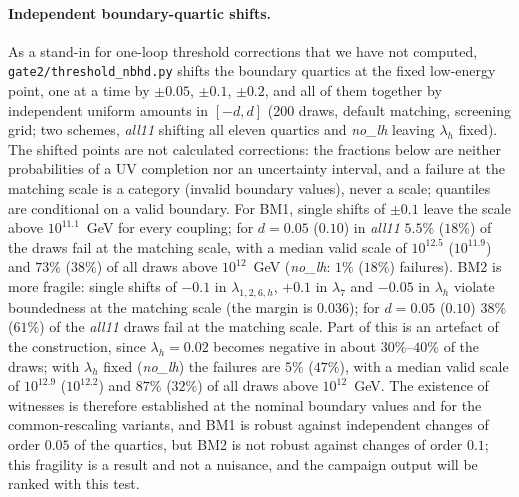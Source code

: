 \documentclass[twocolumn,epjc3]{svjour3}
\begin{document}
\paragraph{Independent boundary-quartic shifts.} As a stand-in for one-loop threshold corrections that we have not computed, \texttt{gate2/threshold\_nbhd.py} shifts the boundary quartics at the fixed low-energy point, one at a time by $\pm0.05$, $\pm0.1$, $\pm0.2$, and all of them together by independent uniform amounts in $[-d,d]$ ($200$ draws, default matching, screening grid; two schemes, \emph{all11} shifting all eleven quartics and \emph{no\_lh} leaving $\lambda_h$ fixed). The shifted points are not calculated corrections: the fractions below are neither probabilities of a UV completion nor an uncertainty interval, and a failure at the matching scale is a category (invalid boundary values), never a scale; quantiles are conditional on a valid boundary. For BM1, single shifts of $\pm0.1$ leave the scale above $10^{11.1}$~GeV for every coupling; for $d=0.05$ ($0.10$) in \emph{all11} $5.5\%$ ($18\%$) of the draws fail at the matching scale, with a median valid scale of $10^{12.5}$ ($10^{11.9}$) and $73\%$ ($38\%$) of all draws above $10^{12}$~GeV (\emph{no\_lh}: $1\%$ ($18\%$) failures). BM2 is more fragile: single shifts of $-0.1$ in $\lambda_{1,2,6,h}$, $+0.1$ in $\lambda_7$ and $-0.05$ in $\lambda_h$ violate boundedness at the matching scale (the margin is $0.036$); for $d=0.05$ ($0.10$) $38\%$ ($61\%$) of the \emph{all11} draws fail at the matching scale. Part of this is an artefact of the construction, since $\lambda_h=0.02$ becomes negative in about $30\%$--$40\%$ of the draws; with $\lambda_h$ fixed (\emph{no\_lh}) the failures are $5\%$ ($47\%$), with a median valid scale of $10^{12.9}$ ($10^{12.2}$) and $87\%$ ($32\%$) of all draws above $10^{12}$~GeV. The existence of witnesses is therefore established at the nominal boundary values and for the common-rescaling variants, and BM1 is robust against independent changes of order $0.05$ of the quartics, but BM2 is not robust against changes of order $0.1$; this fragility is a result and not a nuisance, and the campaign output will be ranked with this test.
\end{document}

